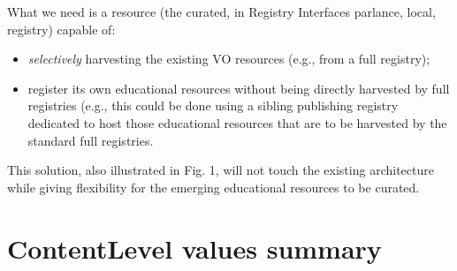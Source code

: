 \documentclass{ivoa}
\begin{document}
What we need is a resource (the curated, in Registry Interfaces
parlance, local, registry) capable of:
  
\begin{itemize}

\item 
\emph{selectively}
 harvesting the existing VO resources 
	(e.g., from a full registry);{}

\item register its own educational resources without being directly
	harvested by full registries (e.g., this could be done using a
	sibling publishing registry dedicated to host those educational
	resources that are to be harvested by the standard full registries.{}

\end{itemize}

This solution, also illustrated in Fig. 1, will not touch the existing architecture
while giving flexibility for the emerging educational resources to 
be curated.
  


\appendix

\section{ContentLevel values summary}

\label{app:clcurrval}
\end{document}
